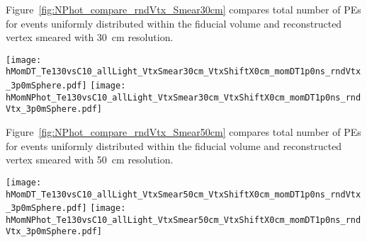 Figure~\ref{fig:NPhot_compare_rndVtx_Smear30cm} compares total number of PEs for events uniformly
distributed within the fiducial volume and reconstructed vertex smeared with 30~cm resolution.

\begin{figure*}[ht]
  \centering
  \texttt{[image: hMomDT\_Te130vsC10\_allLight\_VtxSmear30cm\_VtxShiftX0cm\_momDT1p0ns\_rndVtx\_3p0mSphere.pdf]}
  \texttt{[image: hMomNPhot\_Te130vsC10\_allLight\_VtxSmear30cm\_VtxShiftX0cm\_momDT1p0ns\_rndVtx\_3p0mSphere.pdf]}
  \caption{(Left) Difference between measured PE arrival time and arrival time prediction based on
        vertex location (T$^{predicted} = |r_{hit} - r_{vtx}|/v_{phot}$, where $v_phot = c/1.53$).
        $\vbb$-decay (black solid line) and $\Cten$ events (magenta dashed line) are compared.
        Vertical line at 1~ns indicates cut for early light selection.
        (Right) Total number of PEs in the early light sample.
        $^{10}$C events with energy deposition in the $\pm$10\% energy range around Q-value. are
        selected. Verticies are uniformly distributed within the fiducial volume, $R<3$~m.
        {\bf Vertex is smeared with 30~cm resolution.}}
\label{fig:NPhot_compare_rndVtx_Smear30cm}
\end{figure*}


Figure~\ref{fig:NPhot_compare_rndVtx_Smear50cm} compares total number of PEs for events uniformly
distributed within the fiducial volume and reconstructed vertex smeared with 50~cm resolution.

\begin{figure*}[ht]
  \centering
  \texttt{[image: hMomDT\_Te130vsC10\_allLight\_VtxSmear50cm\_VtxShiftX0cm\_momDT1p0ns\_rndVtx\_3p0mSphere.pdf]}
  \texttt{[image: hMomNPhot\_Te130vsC10\_allLight\_VtxSmear50cm\_VtxShiftX0cm\_momDT1p0ns\_rndVtx\_3p0mSphere.pdf]}
  \caption{(Left) Difference between measured PE arrival time and arrival time prediction based on
        vertex location (T$^{predicted} = |r_{hit} - r_{vtx}|/v_{phot}$, where $v_phot = c/1.53$).
        $\vbb$-decay (black solid line) and $\Cten$ events (magenta dashed line) are compared.
        Vertical line at 1~ns indicates cut for early light selection.
        (Right) Total number of PEs in the early light sample.
        $^{10}$C events with energy deposition in the $\pm$10\% energy range around Q-value are
        selected. Verticies are uniformly distributed within the fiducial volume, $R<3$~m.
        {\bf Vertex is smeared with 50~cm resolution.}}
\label{fig:NPhot_compare_rndVtx_Smear50cm}
\end{figure*}



